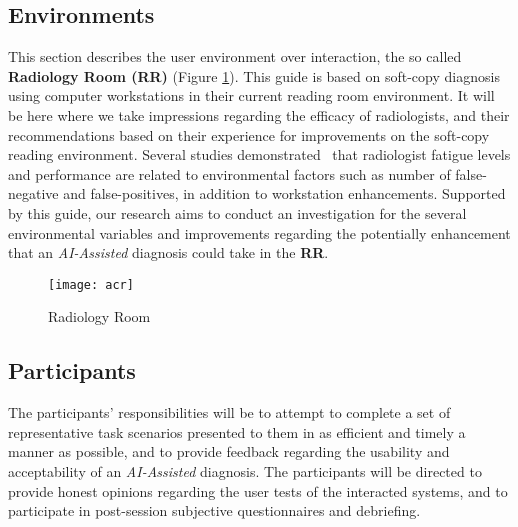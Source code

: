 \subsection{Environments}

This section describes the user environment over interaction, the so called \textbf{Radiology Room (RR)} (Figure \ref{fig:radioroom}). This guide is based on soft-copy diagnosis using computer workstations in their current reading room environment. It will be here where we take impressions regarding the efficacy of radiologists, and their recommendations based on their experience for improvements on the soft-copy reading environment. Several studies demonstrated~\cite{waite2017tired} that radiologist fatigue levels and performance are related to environmental factors such as number of false-negative and false-positives, in addition to workstation enhancements. Supported by this guide, our research aims to conduct an investigation for the several environmental variables and improvements regarding the potentially enhancement that an \textit{AI-Assisted} diagnosis could take in the \textbf{RR}.


\begin{figure}[h]
\centering
\texttt{[image: acr]}
\caption{Radiology Room}
\label{fig:radioroom}
\end{figure}



\subsection{Participants}

The participants' responsibilities will be to attempt to complete a set of representative task scenarios presented to them in as efficient and timely a manner as possible, and to provide feedback regarding the usability and acceptability of an \textit{AI-Assisted} diagnosis. The participants will be directed to provide honest opinions regarding the user tests of the interacted systems, and to participate in post-session subjective questionnaires and debriefing.

